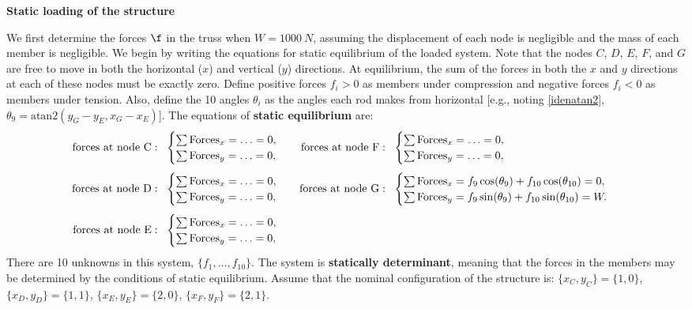 \begin{exercise} \label{ex:04.Truss;1} \rm {\bf Static loading of the structure}\vskip0.05in

\noindent We first determine the forces $\f$ in the truss when $W=1000\
N$, assuming the displacement of each node is negligible and the mass of each member
is negligible.  We begin by writing the equations for static
equilibrium of the loaded system.  Note that the nodes $C$, $D$, $E$,
$F$, and $G$ are free to move in both the horizontal ($x$) and
vertical ($y$) directions.  At equilibrium, the sum of the forces in
both the $x$ and $y$ directions at each of these nodes must be exactly
zero.  Define positive forces $f_i>0$ as members under compression and
negative forces $f_i<0$ as members under tension.  Also, define the 10 angles
$\theta_i$ as the angles each rod makes from
horizontal [e.g., noting \eqref{idenatan2}, $\theta_9=\textrm{atan2}(y_G-y_E,x_G-x_E)$].
The equations of {\bf static equilibrium} are:
\begin{equation*}
\begin{aligned}[t]
{\rm forces\ at\ node\ C:}\ \   &
\begin{cases}\sum \textrm{Forces}_x = \ldots = 0,&\\
             \sum \textrm{Forces}_y = \ldots = 0,&\end{cases}\\[0.05in]
{\rm forces\ at\ node\ D:}\ \   &
\begin{cases}\sum \textrm{Forces}_x = \ldots = 0,&\\
             \sum \textrm{Forces}_y = \ldots = 0,&\end{cases}\\[0.05in]
{\rm forces\ at\ node\ E:}\ \   &
\begin{cases}\sum \textrm{Forces}_x = \ldots = 0,&\\
             \sum \textrm{Forces}_y = \ldots = 0,&\end{cases}
\end{aligned}\ \ \ 
\begin{aligned}[t]
{\rm forces\ at\ node\ F:}\ \   &
\begin{cases}\sum \textrm{Forces}_x = \ldots = 0,&\\
             \sum \textrm{Forces}_y = \ldots = 0,&\end{cases}\\[0.05in]
{\rm forces\ at\ node\ G:}\ \   &
\begin{cases}\sum \textrm{Forces}_x = f_9 \cos(\theta_9) + f_{10} \cos(\theta_{10}) = 0,&\\
             \sum \textrm{Forces}_y = f_9 \sin(\theta_9) + f_{10} \sin(\theta_{10}) = W.&\end{cases}
\end{aligned}
\end{equation*}
\clearpage
There are 10 unknowns in this system, $\{f_1, \ldots, f_{10}\}$. 
The system is {\bf statically determinant},
meaning that the forces in the members may be determined by the conditions of static equilibrium.  
Assume that the nominal configuration of the structure is: $\{x_C,y_C\}=\{1,0\}$, $\{x_D,y_D\}=\{1,1\}$, $\{x_E,y_E\}=\{2,0\}$, $\{x_F,y_F\}=\{2,1\}$.
\vskip0.1in


\end{exercise}

